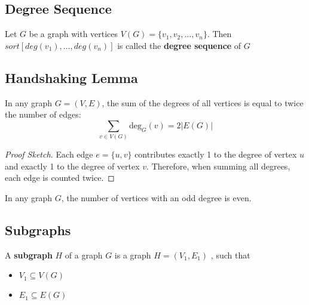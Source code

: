\documentclass[docmute]{article}
\begin{document}
 

\subsection*{Degree Sequence}
Let \(G\) be a graph with vertices \(V(G) = \{v_1, v_2, \dots, v_n\}\). Then \( sort  [deg(v_1),\dots, deg(v_n) ] \) is called the \textbf{degree sequence} of \(G\)

\subsection*{Handshaking Lemma}
In any graph \(G=(V,E)\), the sum of the degrees of all vertices is equal to twice the number of edges:
\[ \sum_{v \in V(G)} \text{deg}_G(v) = 2|E(G)| \]
\begin{proof}[Proof Sketch]
Each edge \(e = \{u,v\}\) contributes exactly 1 to the degree of vertex \(u\) and exactly 1 to the degree of vertex \(v\). Therefore, when summing all degrees, each edge is counted twice.
\end{proof}

\begin{corollary}
In any graph \(G\), the number of vertices with an odd degree is even.
\end{corollary}

\subsection*{Subgraphs}
A \textbf{subgraph} \(H\) of a graph \(G\) is a graph \(H=(V_1,E_1)\) , such that
\begin{itemize}
    \item \(V_1 \subseteq V(G)\)
    \item \(E_1 \subseteq E(G)\)
\end{itemize}
\end{document}
